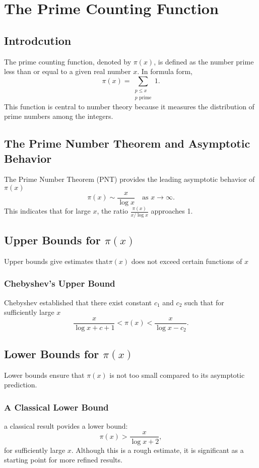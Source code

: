 \chapter{The Prime Counting Function}
\label{chap:prime_counting_function}

\section{Introdcution}
The prime counting function, denoted by $\pi(x)$, is defined as the number prime less than or equal to a given real number $x$. In formula form,
\[
\pi(x) = \sum_{\substack{p \le x \\ p \text{ prime}}} 1.
\]
This function is central to number theory because it measures the distribution of prime numbers among the integers.

\section{The Prime Number Theorem and Asymptotic Behavior}
The Prime Number Theorem (PNT) provides the leading asymptotic behavior of $\pi(x)$
\[
\pi(x) \sim \frac{x}{\log x} \quad \text{as } x \to \infty.
\]
This indicates that for large $x$, the ratio $\frac{\pi(x)}{x/\log x}$ approaches 1.

\section{Upper Bounds for $\pi(x)$}
Upper bounds give estimates that$\pi(x)$ does not exceed certain functions of $x$

\subsection{Chebyshev's Upper Bound} 
Chebyshev established that there exist constant $c_1$ and $c_2$ such that for sufficiently large $x$
\[
\frac{x}{\log x +c+1} < \pi(x) < \frac{x}{\log x - c_2}.
\]

\section{Lower Bounds for $\pi(x)$}
Lower bounds ensure that $\pi(x)$ is not too small compared to its asymptotic prediction. 

\subsection{A Classical Lower Bound}
a classical result povides a lower bound: 
\[
\pi(x) > \frac{x}{\log x + 2},
\]
for sufficiently large $x$. Although this is a rough estimate, it is significant as a starting point for more refined results.

